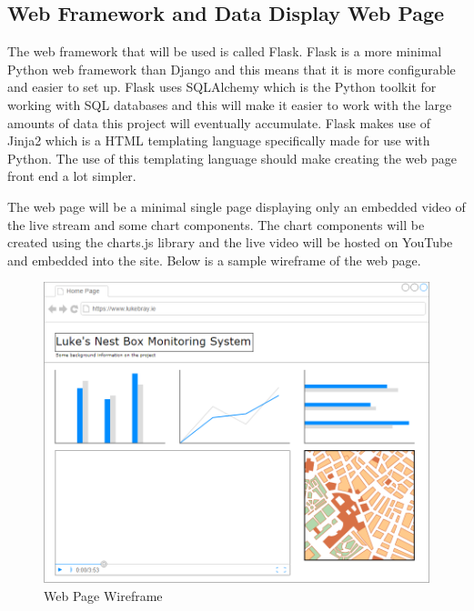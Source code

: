 \documentclass[10pt,a4paper]{article}
\begin{document}
\subsection{Web Framework and Data Display Web Page}
The web framework that will be used is called Flask. Flask is a more minimal Python web framework than Django and this means that it is more configurable and easier to set up. Flask uses SQLAlchemy which is the Python toolkit for working with SQL databases and this will make it easier to work with the large amounts of data this project will eventually accumulate. Flask makes use of Jinja2 which is a HTML templating language specifically made for use with Python. The use of this templating language should make creating the web page front end a lot simpler.

The web page will be a minimal single page displaying only an embedded video of the live stream and some chart components. The chart components will be created using the charts.js library and the live video will be hosted on YouTube and embedded into the site. Below is a sample wireframe of the web page. 

\begin{figure}[H]
\centering
  \includegraphics[width=\linewidth]{images/web_page_mock_up.png}
  \caption{Web Page Wireframe}
  \label{fig:webwireframe}
\end{figure}
\end{document}

